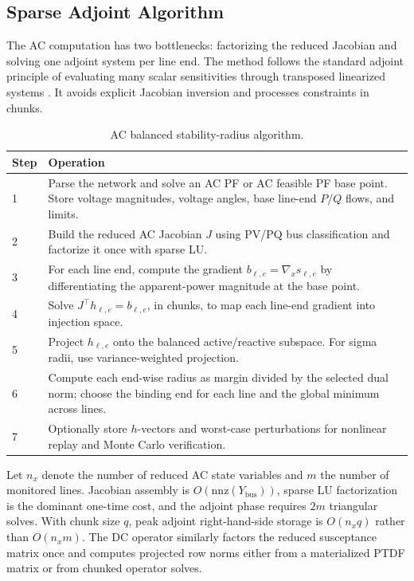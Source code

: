 \documentclass[11pt]{article}
\begin{document}
\subsection{Sparse Adjoint Algorithm}

The AC computation has two bottlenecks: factorizing the reduced Jacobian and solving one adjoint system per line end. The method follows the standard adjoint principle of evaluating many scalar sensitivities through transposed linearized systems \citep{GilesPierce2000}. It avoids explicit Jacobian inversion and processes constraints in chunks.

\begin{table}[t]
\centering
\caption{AC balanced stability-radius algorithm.}
\label{tab:algorithm}
\begin{tabularx}{\textwidth}{@{}lX@{}}
\toprule
Step & Operation \\
\midrule
1 & Parse the network and solve an AC PF or AC feasible PF base point. Store voltage magnitudes, voltage angles, base line-end $P/Q$ flows, and limits. \\
2 & Build the reduced AC Jacobian $J$ using PV/PQ bus classification and factorize it once with sparse LU. \\
3 & For each line end, compute the gradient $b_{\ell,e}=\nabla_x s_{\ell,e}$ by differentiating the apparent-power magnitude at the base point. \\
4 & Solve $J^\top h_{\ell,e}=b_{\ell,e}$, in chunks, to map each line-end gradient into injection space. \\
5 & Project $h_{\ell,e}$ onto the balanced active/reactive subspace. For sigma radii, use variance-weighted projection. \\
6 & Compute each end-wise radius as margin divided by the selected dual norm; choose the binding end for each line and the global minimum across lines. \\
7 & Optionally store $h$-vectors and worst-case perturbations for nonlinear replay and Monte Carlo verification. \\
\bottomrule
\end{tabularx}
\end{table}

Let $n_x$ denote the number of reduced AC state variables and $m$ the number of monitored lines. Jacobian assembly is $O(\mathrm{nnz}(Y_{\mathrm{bus}}))$, sparse LU factorization is the dominant one-time cost, and the adjoint phase requires $2m$ triangular solves. With chunk size $q$, peak adjoint right-hand-side storage is $O(n_x q)$ rather than $O(n_x m)$. The DC operator similarly factors the reduced susceptance matrix once and computes projected row norms either from a materialized PTDF matrix or from chunked operator solves.
\end{document}
